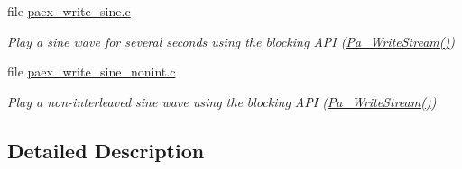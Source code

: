 \begin{DoxyCompactItemize}
file \hyperlink{paex__write__sine_8c}{paex\+\_\+write\+\_\+sine.\+c}
\begin{DoxyCompactList}\small\item\em Play a sine wave for several seconds using the blocking A\+PI (\hyperlink{portaudio_8h_a075a6efb503a728213bdae24347ed27d}{Pa\+\_\+\+Write\+Stream()}) \end{DoxyCompactList}\item 
file \hyperlink{paex__write__sine__nonint_8c}{paex\+\_\+write\+\_\+sine\+\_\+nonint.\+c}
\begin{DoxyCompactList}\small\item\em Play a non-\/interleaved sine wave using the blocking A\+PI (\hyperlink{portaudio_8h_a075a6efb503a728213bdae24347ed27d}{Pa\+\_\+\+Write\+Stream()}) \end{DoxyCompactList}\end{DoxyCompactItemize}


\subsection{Detailed Description}
